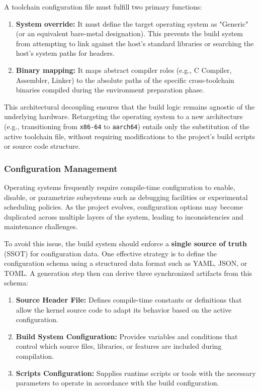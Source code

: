 \documentclass[a4paper,10pt,twoside]{report}
\theoremstyle{definition}
\begin{document}
A toolchain configuration file must fulfill two primary functions:
\begin{enumerate}
\item \textbf{System override:} It must define the target operating system as "Generic" (or an equivalent bare-metal designation). This prevents the build system from attempting to link against the host's standard libraries or searching the host's system paths for headers.
\item \textbf{Binary mapping:} It maps abstract compiler roles (e.g., C Compiler, Assembler, Linker) to the absolute paths of the specific cross-toolchain binaries compiled during the environment preparation phase.
\end{enumerate}

This architectural decoupling ensures that the build logic remains agnostic of the underlying hardware. Retargeting the operating system to a new architecture (e.g., transitioning from \texttt{x86-64} to \texttt{aarch64}) entails only the substitution of the active toolchain file, without requiring modifications to the project's build scripts or source code structure.

\subsubsection{Configuration Management}

Operating systems frequently require compile-time configuration to enable, disable, or parametrize subsystems such as debugging facilities or experimental scheduling policies. As the project evolves, configuration options may become duplicated across multiple layers of the system, leading to inconsistencies and maintenance challenges.

To avoid this issue, the build system should enforce a \textbf{single source of truth} (SSOT) for configuration data. One effective strategy is to define the configuration schema using a structured data format such as YAML, JSON, or TOML. A generation step then can derive three synchronized artifacts from this schema:
\begin{enumerate}
    \item \textbf{Source Header File:} Defines compile-time constants or definitions that allow the kernel source code to adapt its behavior based on the active configuration.
    \item \textbf{Build System Configuration:} Provides variables and conditions that control which source files, libraries, or features are included during compilation.
    \item \textbf{Scripts Configuration:} Supplies runtime scripts or tools with the necessary parameters to operate in accordance with the build configuration.
\end{enumerate}
\end{document}
